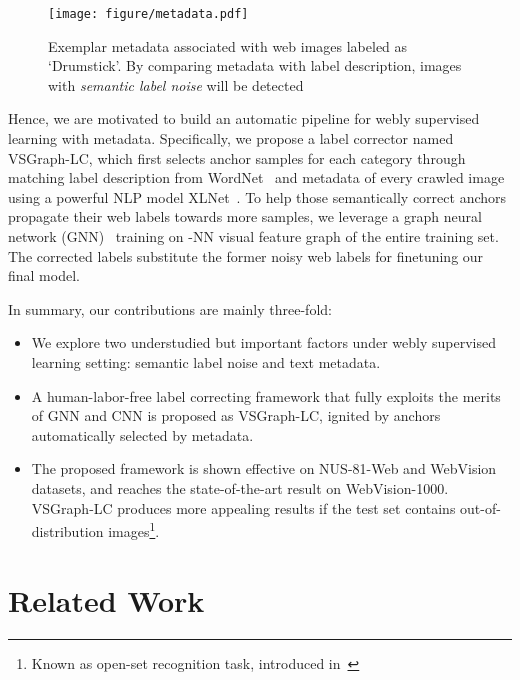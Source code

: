 \documentclass[sigconf]{acmart}
\begin{document}
\begin{figure}
	\centering
\texttt{[image: figure/metadata.pdf]}
	\caption{Exemplar metadata associated with web images labeled as `Drumstick'. 
	By comparing metadata with label description, images with \textit{semantic label noise} will be detected}
	\label{fig:text}
\end{figure}

Hence, we are motivated to build an automatic pipeline for webly supervised learning with metadata. Specifically, we propose a label corrector named VSGraph-LC, which first selects anchor samples for each category through matching label description from WordNet~\cite{miller1998wordnet} and metadata of every crawled image using a powerful NLP model XLNet~\cite{yang2019xlnet}. To help those semantically correct anchors propagate their web labels towards more samples, we leverage a graph neural network (GNN)~\cite{kipf2016gcn} training on -NN visual feature graph of the entire training set.
The corrected labels substitute the former noisy web labels 
for finetuning our final model.

In summary, our contributions are mainly three-fold:
\begin{itemize}
    \item We explore two understudied but important factors under webly supervised learning setting: semantic label noise and text metadata.
    \item A human-labor-free label correcting framework that fully exploits the merits of GNN and CNN is proposed as VSGraph-LC, ignited by anchors automatically selected by metadata.
    \item The proposed framework is shown effective on NUS-81-Web and WebVision datasets, and reaches the state-of-the-art result on WebVision-1000. VSGraph-LC produces more appealing results if the test set contains out-of-distribution images\footnote{Known as open-set recognition task, introduced in~\cite{kuznetsova2018open}}.
\end{itemize}

\section{Related Work}
\label{sec:related}
\end{document}
